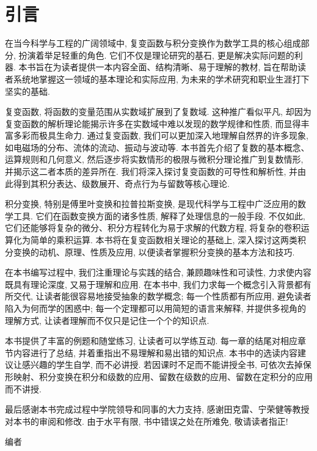 
\chapter{引言}

在当今科学与工程的广阔领域中, 复变函数与积分变换作为数学工具的核心组成部分, 扮演着举足轻重的角色.
它们不仅是理论研究的基石, 更是解决实际问题的利器.
本书旨在为读者提供一本内容全面、结构清晰、易于理解的教材, 旨在帮助读者系统地掌握这一领域的基本理论和实际应用, 为未来的学术研究和职业生涯打下坚实的基础. 

复变函数, 将函数的变量范围从实数域扩展到了复数域.
这种推广看似平凡, 却因为复变函数的解析理论能揭示许多在实数域中难以发现的数学规律和性质, 而显得丰富多彩而极具生命力.
通过复变函数, 我们可以更加深入地理解自然界的许多现象, 如电磁场的分布、流体的流动、振动与波动等.
本书首先介绍了复数的基本概念、运算规则和几何意义, 然后逐步将实数情形的极限与微积分理论推广到复数情形, 并揭示这二者本质的差异所在.
我们将深入探讨复变函数的可导性和解析性, 并由此得到其积分表达、级数展开、奇点行为与留数等核心理论. 

积分变换, 特别是傅里叶变换和拉普拉斯变换, 是现代科学与工程中广泛应用的数学工具.
它们在函数变换方面的诸多性质, 解释了处理信息的一般手段.
不仅如此, 它们还能够将复杂的微分、积分方程转化为易于求解的代数方程, 将复杂的卷积运算化为简单的乘积运算.
本书将在复变函数相关理论的基础上, 深入探讨这两类积分变换的动机、原理、性质及应用, 以便读者掌握积分变换的基本方法和技巧.

在本书编写过程中, 我们注重理论与实践的结合, 兼顾趣味性和可读性, 力求使内容既具有理论深度, 又易于理解和应用.
在本书中, 我们力求每一个概念引入背景都有所交代, 让读者能很容易地接受抽象的数学概念;
每一个性质都有所应用, 避免读者陷入为何而学的困惑中;
每一个定理都可以用简短的语言来解释, 并提供多视角的理解方式, 让读者理解而不仅只是记住一个个的知识点.

本书提供了丰富的例题和随堂练习, 让读者可以学练互动.
每一章的结尾对相应章节内容进行了总结, 并着重指出不易理解和易出错的知识点. 
本书中的选读内容建议让感兴趣的学生自学, 而不必讲授.
若因课时不足而不能讲授全书, 可依次去掉保形映射、积分变换在积分和级数的应用、留数在级数的应用、留数在定积分的应用而不讲授.

最后感谢本书完成过程中学院领导和同事的大力支持, 感谢田克雷、宁荣健等教授对本书的审阅和修改.
由于水平有限, 书中错误之处在所难免, 敬请读者指正!

\vskip 0.5cm
\begin{flushright}
编者

\zhtoday
\end{flushright}
